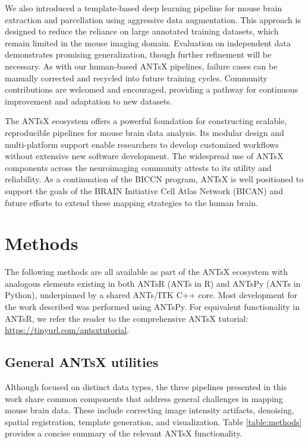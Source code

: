 \documentclass[
  12pt,
]{article}
\begin{document}
We also introduced a template-based deep learning pipeline for mouse
brain extraction and parcellation using aggressive data augmentation.
This approach is designed to reduce the reliance on large annotated
training datasets, which remain limited in the mouse imaging domain.
Evaluation on independent data demonstrates promising generalization,
though further refinement will be necessary. As with our human-based
ANTsX pipelines, failure cases can be manually corrected and recycled
into future training cycles. Community contributions are welcomed and
encouraged, providing a pathway for continuous improvement and
adaptation to new datasets.

The ANTsX ecosystem offers a powerful foundation for constructing
scalable, reproducible pipelines for mouse brain data analysis. Its
modular design and multi-platform support enable researchers to develop
customized workflows without extensive new software development. The
widespread use of ANTsX components across the neuroimaging community
attests to its utility and reliability. As a continuation of the BICCN
program, ANTsX is well positioned to support the goals of the BRAIN
Initiative Cell Atlas Network (BICAN) and future efforts to extend these
mapping strategies to the human brain.

\clearpage \newpage

\section{Methods}\label{methods}

The following methods are all available as part of the ANTsX ecosystem
with analogous elements existing in both ANTsR (ANTs in R) and ANTsPy
(ANTs in Python), underpinned by a shared ANTs/ITK C++ core. Most
development for the work described was performed using ANTsPy. For
equivalent functionality in ANTsR, we refer the reader to the
comprehensive ANTsX tutorial: \url{https://tinyurl.com/antsxtutorial}.

\subsection{General ANTsX utilities}\label{general-antsx-utilities}

Although focused on distinct data types, the three pipelines presented
in this work share common components that address general challenges in
mapping mouse brain data. These include correcting image intensity
artifacts, denoising, spatial registration, template generation, and
visualization. Table \ref{table:methods} provides a concise summary of
the relevant ANTsX functionality.
\end{document}
